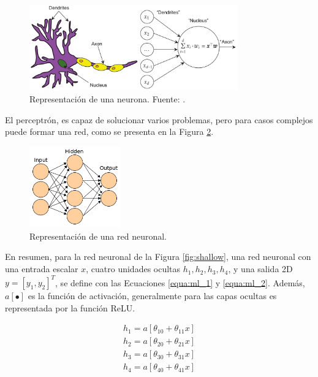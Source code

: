 
\begin{figure}[H]
	\centering
	\includegraphics[width=0.8\textwidth]{../img/neoantigen/neuron}
	\caption{Representación de una neurona. Fuente: \cite{insideDL2022}.}
	\label{fig:neuron}
\end{figure}

El perceptrón, es capaz de solucionar varios problemas, pero para casos complejos puede formar una red, como se presenta en la Figura \ref{fig:nn}.

\begin{figure}[H]
	\centering
	\includegraphics[width=0.35\textwidth]{../img/neoantigen/nn2}
	\caption{Representación de una red neuronal. }
	\label{fig:nn}
\end{figure}

En resumen, para la red neuronal de la Figura \ref{fig:shallow}, una red neuronal con una entrada escalar $x$, cuatro unidades ocultas $h_1, h_2, h_3, h_4$, y una salida 2D $y = [y_1, y_2]^T$, se define con las Ecuaciones \ref{equa:ml_1} y \ref{equa:ml_2}. Además, $a[\bullet]$ es la función de activación, generalmente para las capas ocultas es representada por la función ReLU.

\begin{equation}\label{equa:ml_1}
	\begin{split}
	h_1 = a [ \theta_{10} + \theta_{11}x  ]	 \\	
	h_2 = a [ \theta_{20} + \theta_{21}x  ]	 \\
	h_3 = a [ \theta_{30} + \theta_{31}x  ]	 \\
	h_4 = a [ \theta_{40} + \theta_{41}x  ]	 
	\end{split}
\end{equation}	

